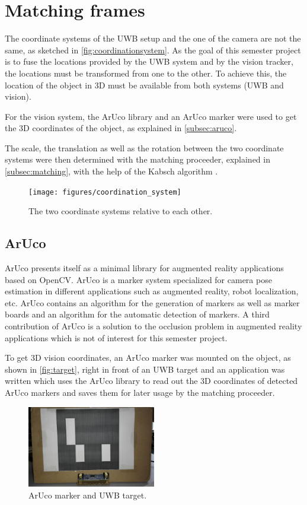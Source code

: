 \section{Matching frames}
The coordinate systems of the \ac{UWB} setup and the one of the camera are not the same, as sketched in \autoref{fig:coordinationsystem}. As the goal of this semester project is to fuse the locations provided by the \ac{UWB} system and by the vision tracker, the locations must be transformed from one to the other. To achieve this, the location of the object in 3D must be available from both systems (\ac{UWB} and vision).

For the vision system, the ArUco \cite{Aruco2014} library and an ArUco marker were used to get the 3D coordinates of the object, as explained in \autoref{subsec:aruco}.

The scale, the translation as well as the rotation between the two coordinate systems were then determined with the matching proceeder, explained in \autoref{subsec:matching}, with the help of the Kabsch algorithm \cite{Kabsch:a12999}.
\begin{figure}[ht!]\centering
	\texttt{[image: figures/coordination\_system]}
	\caption{The two coordinate systems relative to each other.}\label{fig:coordinationsystem}
\end{figure}

\subsection{ArUco}\label{subsec:aruco}
ArUco \cite{Aruco2014} presents itself as a minimal library for augmented reality applications based on OpenCV. ArUco is a marker system specialized for camera pose estimation in different applications such as augmented reality, robot localization, etc. ArUco contains an algorithm for the generation of markers as well as marker boards and an algorithm for the automatic detection of markers. A third contribution of ArUco is a solution to the occlusion problem in augmented reality applications which is not of interest for this semester project.

To get 3D vision coordinates, an ArUco marker was mounted on the object, as shown in \autoref{fig:target}, right in front of an \ac{UWB} target and an application was written which uses the ArUco library to read out the 3D coordinates of detected ArUco markers and saves them for later usage by the matching proceeder.
\begin{figure}[ht!]\centering
	\includegraphics[width=0.5\textwidth]{figures/Box_cut.jpg}
	\caption{ArUco marker and \ac{UWB} target.}\label{fig:target}
\end{figure}


